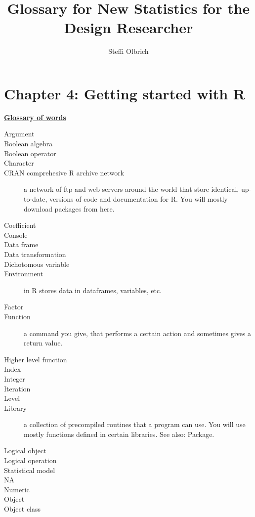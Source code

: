 \documentclass{article}
\title{Glossary for New Statistics for the Design Researcher}
\author{Steffi Olbrich}
\begin{document}
\maketitle

\section{Chapter 4: Getting started with R}
\underline{\textbf{Glossary of words}}

\begin{description}

\item [Argument]
\item [Boolean algebra]
\item [Boolean operator]
\item [Character]
\item [CRAN comprehesive R archive network] a network of ftp and web servers around the world that store identical, up-to-date, versions of code and documentation for R. You will mostly download packages from here.
\item [Coefficient]
\item [Console]
\item [Data frame]
\item [Data transformation]
\item [Dichotomous variable]
\item [Environment] in R stores data in dataframes, variables, etc. 
\item [Factor]
\item [Function] a command you give, that performs a certain action and sometimes gives a return value.
\item [Higher level function]
\item [Index]
\item [Integer]
\item [Iteration]
\item [Level]
\item [Library] a collection of precompiled routines that a program can use. You will use mostly functions defined in certain libraries. See also: Package.
\item [Logical object]
\item [Logical operation]
\item [Statistical model]
\item [NA]
\item [Numeric]
\item [Object]
\item [Object class]

\end{description}
\end{document}
